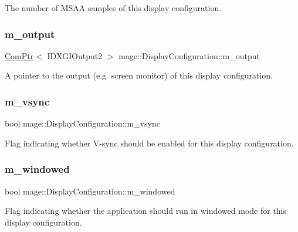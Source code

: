The number of M\+S\+AA samples of this display configuration. \hypertarget{structmage_1_1_display_configuration_a483b3b999f4736084daa819a15adfb80}{}\label{structmage_1_1_display_configuration_a483b3b999f4736084daa819a15adfb80} 
\subsubsection{\texorpdfstring{m\+\_\+output}{m\_output}}
{\footnotesize\ttfamily \hyperlink{namespacemage_ae74f374780900893caa5555d1031fd79}{Com\+Ptr}$<$ I\+D\+X\+G\+I\+Output2 $>$ mage\+::\+Display\+Configuration\+::m\+\_\+output\hspace{0.3cm}{\ttfamily [private]}}

A pointer to the output (e.\+g. screen monitor) of this display configuration. \hypertarget{structmage_1_1_display_configuration_a22dd3b35e58260c9555a37aef0e85a4d}{}\label{structmage_1_1_display_configuration_a22dd3b35e58260c9555a37aef0e85a4d} 
\subsubsection{\texorpdfstring{m\+\_\+vsync}{m\_vsync}}
{\footnotesize\ttfamily bool mage\+::\+Display\+Configuration\+::m\+\_\+vsync\hspace{0.3cm}{\ttfamily [private]}}

Flag indicating whether V-\/sync should be enabled for this display configuration. \hypertarget{structmage_1_1_display_configuration_a0c447e4bd7ea72313315c657e9cd0d95}{}\label{structmage_1_1_display_configuration_a0c447e4bd7ea72313315c657e9cd0d95} 
\subsubsection{\texorpdfstring{m\+\_\+windowed}{m\_windowed}}
{\footnotesize\ttfamily bool mage\+::\+Display\+Configuration\+::m\+\_\+windowed\hspace{0.3cm}{\ttfamily [private]}}

Flag indicating whether the application should run in windowed mode for this display configuration. 